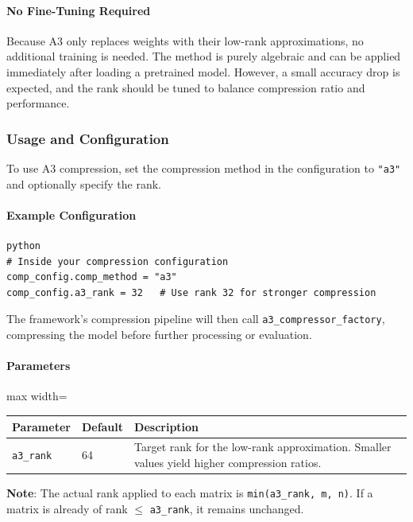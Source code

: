 \paragraph{No Fine-Tuning Required}

Because A3 only replaces weights with their low-rank approximations, no additional training is needed. The method is purely algebraic and can be applied immediately after loading a pretrained model. However, a small accuracy drop is expected, and the rank should be tuned to balance compression ratio and performance.


\subsubsection*{Usage and Configuration}

To use A3 compression, set the compression method in the configuration to \texttt{"a3"} and optionally specify the rank.

\paragraph{Example Configuration}

\vspace{0.5em}
\begin{mdframed}[backgroundcolor=codebg, linecolor=codeframe, linewidth=1pt, roundcorner=4pt, innerleftmargin=2pt, innerrightmargin=5pt, innertopmargin=5pt, innerbottommargin=5pt]
\begin{lstlisting}
python
# Inside your compression configuration
comp_config.comp_method = "a3"
comp_config.a3_rank = 32   # Use rank 32 for stronger compression
\end{lstlisting}
\end{mdframed}
\vspace{0.5em}

The framework's compression pipeline will then call \texttt{a3\_compressor\_factory}, compressing the model before further processing or evaluation.

\paragraph{Parameters}

\begin{center}
\begin{adjustbox}{max width=\columnwidth}
\renewcommand{\arraystretch}{1.2}
\begin{tabular}{lll}
\toprule
Parameter & Default & Description \\
\midrule
\texttt{a3\_rank} & 64 & Target rank for the low-rank approximation. Smaller values yield higher compression ratios. \\

\bottomrule
\end{tabular}
\end{adjustbox}
\end{center}
\textbf{Note}: The actual rank applied to each matrix is \texttt{min(a3\_rank, m, n)}. If a matrix is already of rank $\le$ \texttt{a3\_rank}, it remains unchanged.

